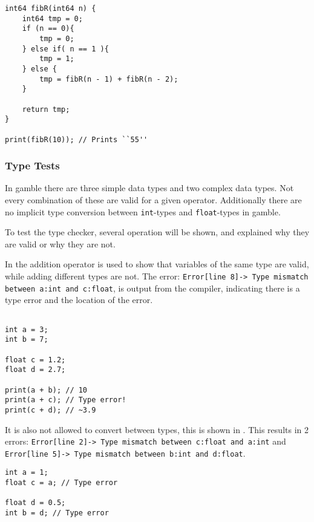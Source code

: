 \begin{lstlisting}[caption={Recursive Fibonacci in \gls{gamble}},label={lst:fibR},frame=tb]
int64 fibR(int64 n) {
    int64 tmp = 0;
    if (n == 0){
        tmp = 0;
    } else if( n == 1 ){
        tmp = 1;
    } else {
        tmp = fibR(n - 1) + fibR(n - 2);
    }

    return tmp;
}

print(fibR(10)); // Prints ``55''
\end{lstlisting}

\subsubsection*{Type Tests}
In \gls{gamble} there are three simple data types and two complex data types.
Not every combination of these are valid for a given operator.
Additionally there are no implicit type conversion between \texttt{int}-types and \texttt{float}-types in \gls{gamble}.

To test the type checker, several operation will be shown, and explained why they are valid or why they are not.

In  the addition operator is used to show that variables of the same type are valid, while adding different types are not.
The error: \texttt{Error[line    8]-> Type mismatch between a:int and c:float}, is output from the compiler, indicating there is a type error and the location of the error.
\begin{lstlisting}[caption={Addition in \gls{gamble} to demonstrate the type checker.},label={lst:type1},frame=tb]

int a = 3;
int b = 7;

float c = 1.2;
float d = 2.7;

print(a + b); // 10
print(a + c); // Type error!
print(c + d); // ~3.9
\end{lstlisting}

It is also not allowed to convert between types, this is shown in .
This results in 2 errors: \texttt{Error[line    2]-> Type mismatch between c:float and a:int} and \texttt{Error[line    5]-> Type mismatch between b:int and d:float}.

\begin{lstlisting}[caption={Examples of type incompatibilities \gls{gamble} to demonstrate the type checker.},label={lst:type2},frame=tb]
int a = 1;
float c = a; // Type error

float d = 0.5;
int b = d; // Type error
\end{lstlisting}

